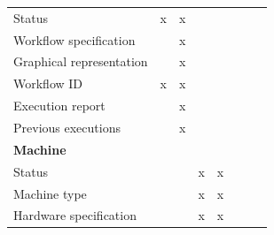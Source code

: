 \begin{table}[htbp]
{\begin{tabular}{lccccccc}
            Status                              & x                 & x                             &                          &                     &                         &                           &                           \\
            Workflow specification              &                   & x                             &                          &                     &                         &                           &                           \\
            Graphical representation            &                   & x                             &                          &                     &                         &                           &                           \\
            Workflow ID                         & x                 & x                             &                          &                     &                         &                           &                           \\
            Execution report                    &                   & x                             &                          &                     &                         &                           &                           \\
            Previous executions                 &                   & x                             &                          &                     &                         &                           &                           \\
            \midrule
            \multicolumn{8}{l}{\textbf{Machine}}                                                                                                                                                                                       \\[3pt]
            Status                              &                   &                               & x                        & x                   &                         &                           &                           \\
            Machine type                        &                   &                               & x                        & x                   &                         &                           &                           \\
            Hardware specification              &                   &                               & x                        & x                   &                         &                           &                           \\

\end{tabular}}
\end{table}
